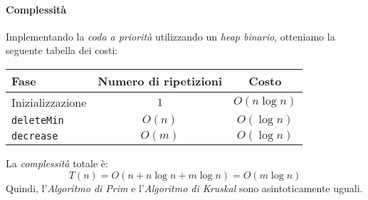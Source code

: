\paragraph{Complessità}
Implementando la \emph{coda a priorità} utilizzando un \emph{heap binario},
otteniamo la seguente tabella dei costi:

\begin{table}[h!]
    \centering
    \renewcommand{\arraystretch}{1.2}
    \begin{tabular}{|l|c|c|}
        \hline
        \textbf{Fase} & \textbf{Numero di ripetizioni} & \textbf{Costo}\\
        \hline
        Inizializzazione & $1$ & $O(n\log n)$\\
        \hline
        \texttt{deleteMin} & $O(n)$ & $O(\log n)$\\
        \hline
        \texttt{decrease} & $O(m)$ & $O(\log n)$\\
        \hline
    \end{tabular}
\end{table}\noindent
La \emph{complessità} totale è:
\[T(n)=O(n+n\log n+m\log n)=O(m\log n)\]
Quindi, l'\emph{Algoritmo di Prim} e l'\emph{Algoritmo di Kruskal} sono
asintoticamente uguali.